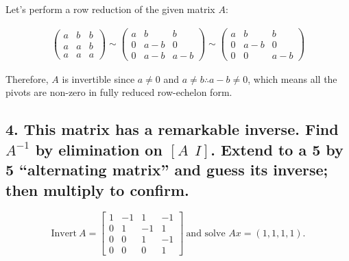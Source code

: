 \documentclass[
  letterpaper,
  DIV=11,
  numbers=noendperiod]{scrartcl}
\begin{document}
Let's perform a row reduction of the given matrix \(A\):

\begin{gather*}
\left(\begin{matrix}
a & b & b \\
a & a & b \\
a & a & a
\end{matrix}\right) \sim \left(\begin{matrix}
a & b & b \\
0 & a-b & 0 \\
0 & a-b & a-b
\end{matrix}\right) \sim \left(\begin{matrix}
a & b & b \\
0 & a-b & 0 \\
0 & 0 & a-b
\end{matrix}\right)
\end{gather*}

Therefore, \(A\) is invertible since \(a \ne 0\) and
\(a \ne b \therefore a-b \ne 0\), which means all the pivots are
non-zero in fully reduced row-echelon form.

\newpage{}

\hypertarget{this-matrix-has-a-remarkable-inverse.-find-a-1-by-elimination-on-a-i.-extend-to-a-5-by-5-alternating-matrix-and-guess-its-inverse-then-multiply-to-confirm.}{%
\subsection{\texorpdfstring{4. This matrix has a remarkable inverse.
Find \(A^{-1}\) by elimination on \([A \ \ I]\). Extend to a 5 by 5
``alternating matrix'' and guess its inverse; then multiply to
confirm.}{4. This matrix has a remarkable inverse. Find A\^{}\{-1\} by elimination on {[}A \textbackslash{} \textbackslash{} I{]}. Extend to a 5 by 5 ``alternating matrix'' and guess its inverse; then multiply to confirm.}}\label{this-matrix-has-a-remarkable-inverse.-find-a-1-by-elimination-on-a-i.-extend-to-a-5-by-5-alternating-matrix-and-guess-its-inverse-then-multiply-to-confirm.}}

\[
\mathrm{Invert} \  A = \begin{bmatrix}
1 & -1 & 1 & -1 \\
0 & 1 & -1 & 1 \\
0 & 0 & 1 & -1 \\
0 & 0 & 0 & 1
\end{bmatrix} \ \text{and solve }Ax = (1, 1, 1, 1).
\]
\end{document}
